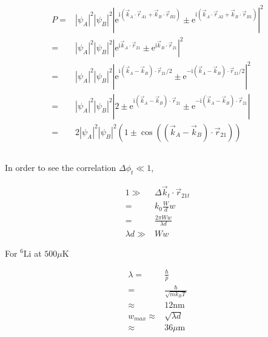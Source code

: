 \documentclass[10pt,fleqn]{article}
\newcommand{\ue}{\mathrm{e}}
\newcommand{\ui}{\mathrm{i}}
\newcommand{\eqar}[1]
{
  \begin{align*}
    #1
  \end{align*}
}
\newcommand{\paren}[1]{{\left({#1}\right)}}
\newcommand{\abs}[1]{{\left|{#1}\right|}}
\begin{document}
\subsection{}
\subsection{}

\section{}
\subsection{}
\eqar{
  P=&\abs{\psi_A}^2\abs{\psi_B}^2\abs{\ue^{\ui\paren{\vec k_A\cdot\vec r_{A1}+\vec k_B\cdot\vec r_{B2}}}\pm\ue^{\ui\paren{\vec k_A\cdot\vec r_{A2}+\vec k_B\cdot\vec r_{B1}}}}^2\\
  =&\abs{\psi_A}^2\abs{\psi_B}^2\abs{\ue^{\ui\vec k_A\cdot\vec r_{21}}\pm\ue^{\ui\vec k_B\cdot\vec r_{21}}}^2\\
  =&\abs{\psi_A}^2\abs{\psi_B}^2\abs{\ue^{\ui\paren{\vec k_A-\vec k_B}\cdot\vec r_{21}/2}\pm\ue^{-\ui\paren{\vec k_A-\vec k_B}\cdot\vec r_{21}/2}}^2\\
  =&\abs{\psi_A}^2\abs{\psi_B}^2\abs{2\pm\ue^{\ui\paren{\vec k_A-\vec k_B}\cdot\vec r_{21}}\pm\ue^{-\ui\paren{\vec k_A-\vec k_B}\cdot\vec r_{21}}}\\
  =&2\abs{\psi_A}^2\abs{\psi_B}^2\paren{1\pm\cos\paren{\paren{\vec k_A-\vec k_B}\cdot\vec r_{21}}}
}
\subsection{}
In order to see the correlation $\Delta\phi_t\ll1$,
\eqar{
  1\gg&\Delta \vec k_t\cdot\vec r_{21t}\\
  =&k_0\frac{W}{d}w\\
  =&\frac{2\pi Ww}{\lambda d}\\
  \lambda d\gg&Ww
}
For $^{6}\text{Li}$ at $500\mu\text{K}$
\eqar{
  \lambda=&\frac{\hbar}{p}\\
  =&\frac{\hbar}{\sqrt{mk_BT}}\\
  \approx&12\text{nm}\\
  w_{max}\approx&\sqrt{\lambda d}\\
  \approx&36\mu\text{m}
}
\subsection{}
\end{document}
